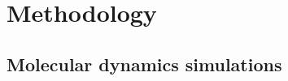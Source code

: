 \documentclass[9pt]{elife}
\providecommand{\DIFdelbegin}{} %
\providecommand{\DIFdelend}{} %
\begin{document}


\DIFdelend %
\section{Methodology}
\subsection{Molecular dynamics simulations}
\DIFdelbegin %
\end{document}
